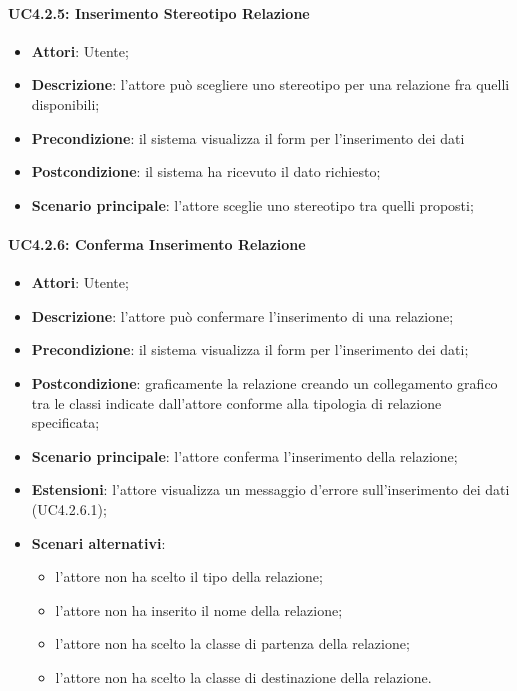\paragraph{UC4.2.5: Inserimento Stereotipo Relazione}
\label{UC4.2.5}
\begin{itemize}
\item \textbf{Attori}: Utente;
\item \textbf{Descrizione}: l'attore può scegliere uno stereotipo per una relazione fra quelli disponibili;
\item \textbf{Precondizione}: il sistema visualizza il form per l'inserimento dei dati	
\item \textbf{Postcondizione}: il sistema ha ricevuto il dato richiesto;	
\item \textbf{Scenario principale}:
l'attore sceglie uno stereotipo tra quelli proposti;
\end{itemize}

\paragraph{UC4.2.6: Conferma Inserimento Relazione}
\label{UC4.2.6}
\begin{itemize}
\item \textbf{Attori}: Utente;
\item \textbf{Descrizione}: l'attore può confermare l'inserimento di una relazione;	
\item \textbf{Precondizione}: il sistema visualizza il form per l'inserimento dei dati;	
\item \textbf{Postcondizione}:  graficamente la relazione creando un collegamento grafico tra le classi indicate dall'attore conforme alla tipologia di relazione specificata;
\item \textbf{Scenario principale}:
l'attore conferma l'inserimento della relazione;	
\item \textbf{Estensioni}:
l'attore visualizza un messaggio d'errore sull'inserimento dei dati (UC4.2.6.1);
\item \textbf{Scenari alternativi}:
\begin{itemize}
	\item l'attore non ha scelto il tipo della relazione;
	\item l'attore non ha inserito il nome della relazione;
	\item l'attore non ha scelto la classe di partenza della relazione;
	\item l'attore non ha scelto la classe di destinazione della relazione.
\end{itemize}
\end{itemize}

